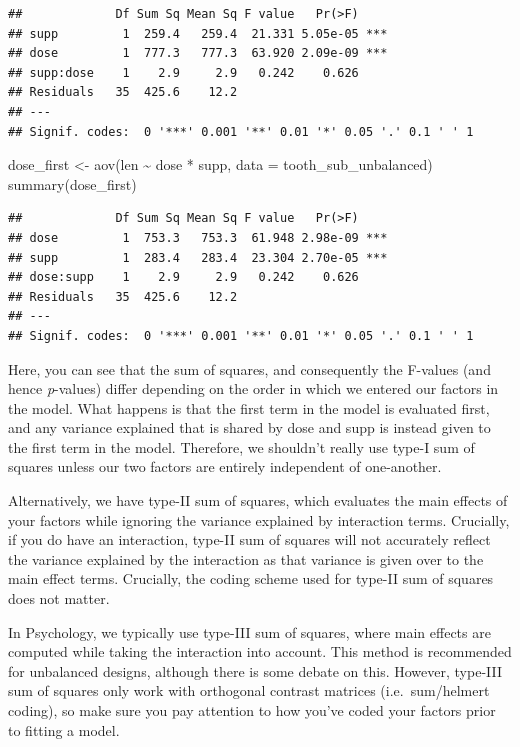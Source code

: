 \documentclass[
]{book}
\newenvironment{Shaded}{\begin{snugshade}}{\end{snugshade}}
\newcommand{\AttributeTok}[1]{\textcolor[rgb]{0.77,0.63,0.00}{#1}}
\newcommand{\FunctionTok}[1]{\textcolor[rgb]{0.00,0.00,0.00}{#1}}
\newcommand{\NormalTok}[1]{#1}
\newcommand{\OtherTok}[1]{\textcolor[rgb]{0.56,0.35,0.01}{#1}}
\newcommand{\SpecialCharTok}[1]{\textcolor[rgb]{0.00,0.00,0.00}{#1}}
\begin{document}
\begin{verbatim}
##             Df Sum Sq Mean Sq F value   Pr(>F)    
## supp         1  259.4   259.4  21.331 5.05e-05 ***
## dose         1  777.3   777.3  63.920 2.09e-09 ***
## supp:dose    1    2.9     2.9   0.242    0.626    
## Residuals   35  425.6    12.2                     
## ---
## Signif. codes:  0 '***' 0.001 '**' 0.01 '*' 0.05 '.' 0.1 ' ' 1
\end{verbatim}

\begin{Shaded}
\begin{Highlighting}[]
\NormalTok{dose\_first }\OtherTok{\textless{}{-}} \FunctionTok{aov}\NormalTok{(len }\SpecialCharTok{\textasciitilde{}}\NormalTok{ dose }\SpecialCharTok{*}\NormalTok{ supp, }\AttributeTok{data =}\NormalTok{ tooth\_sub\_unbalanced)}
\FunctionTok{summary}\NormalTok{(dose\_first)}
\end{Highlighting}
\end{Shaded}

\begin{verbatim}
##             Df Sum Sq Mean Sq F value   Pr(>F)    
## dose         1  753.3   753.3  61.948 2.98e-09 ***
## supp         1  283.4   283.4  23.304 2.70e-05 ***
## dose:supp    1    2.9     2.9   0.242    0.626    
## Residuals   35  425.6    12.2                     
## ---
## Signif. codes:  0 '***' 0.001 '**' 0.01 '*' 0.05 '.' 0.1 ' ' 1
\end{verbatim}

Here, you can see that the sum of squares, and consequently the F-values (and hence \emph{p}-values) differ depending on the order in which we entered our factors in the model. What happens is that the first term in the model is evaluated first, and any variance explained that is shared by dose and supp is instead given to the first term in the model. Therefore, we shouldn't really use type-I sum of squares unless our two factors are entirely independent of one-another.

Alternatively, we have type-II sum of squares, which evaluates the main effects of your factors while ignoring the variance explained by interaction terms. Crucially, if you do have an interaction, type-II sum of squares will not accurately reflect the variance explained by the interaction as that variance is given over to the main effect terms. Crucially, the coding scheme used for type-II sum of squares does not matter.

In Psychology, we typically use type-III sum of squares, where main effects are computed while taking the interaction into account. This method is recommended for unbalanced designs, although there is some debate on this. However, type-III sum of squares only work with orthogonal contrast matrices (i.e.~sum/helmert coding), so make sure you pay attention to how you've coded your factors prior to fitting a model.
\end{document}
